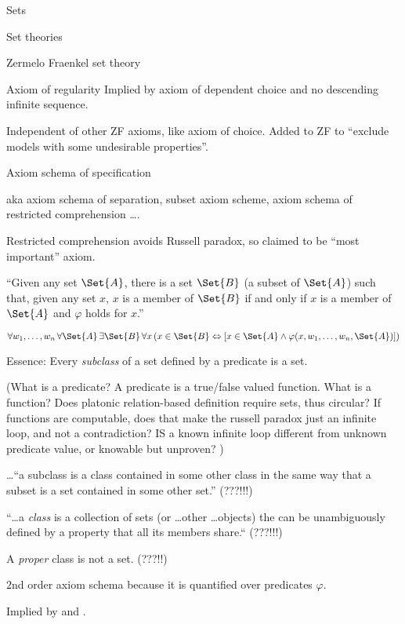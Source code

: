 \begin{plSection}{Sets}
\begin{plSection}{Set theories}
\begin{plSection}{Zermelo Fraenkel set theory}
\begin{plSection}{Axiom of regularity}
Implied by axiom of dependent choice and 
no descending infinite sequence.

Independent of other \textsf{ZF} axioms, like axiom of choice.
Added to \textsf{ZF} to 
``exclude models with some undesirable properties''.

\end{plSection}%
\begin{plSection}{Axiom schema of specification}
\label{sec:Axiom-schema-of-specification}

aka axiom schema of separation, subset axiom scheme,
axiom schema of restricted comprehension \ldots .

Restricted comprehension avoids Russell paradox,
so claimed to be ``most important'' axiom.

``Given any set $\Set{A}$, there is a set $\Set{B}$
 (a subset of $\Set{A}$) 
such that, given any set $x$, 
$x$ is a member of $\Set{B}$ if and only if $x$ 
is a member of $\Set{A}$ 
and $\varphi$ holds for $x$.''
\cite{wiki:AxiomSchemaOfSpecification}

${\displaystyle 
\forall w_{1},\ldots ,w_{n}\,
\forall \Set{A}\,\exists \Set{B}\,
\forall x\,
(x\in \Set{B}
\Leftrightarrow
[x\in \Set{A}\land \varphi (x,w_{1},\ldots ,w_{n},\Set{A})])}$

Essence:
Every \textsl{subclass}
of a set defined by a predicate is a set.

(What is a predicate?
A predicate is a true/false valued function.
What is a function? 
Does platonic relation-based definition require sets,
thus circular?
If functions are computable, does that make the
russell paradox just an infinite loop,
and not a contradiction?
IS a known infinite loop different from 
unknown predicate value, or knowable but unproven?
)

\ldots``a subclass is a class contained in some other class in 
the same way that a subset is a set contained in some other set.''
\cite{wiki:SubclassSetTheory}
(???!!!)

``\dots a \textsl{class} is a collection of sets 
(or \ldots other \ldots objects)
the can be unambiguously defined by a property 
that all its members share.``\cite{wiki:ClassSetTheory}
(???!!!)

A \textsl{proper} class is not a set. (???!!)

$2$nd order axiom schema because it is quantified over predicates
 $\varphi$.

Implied by 
and \cite{wiki:AxiomOfEmptySet}.


\end{plSection}
\end{plSection}
\end{plSection}
\end{plSection}
